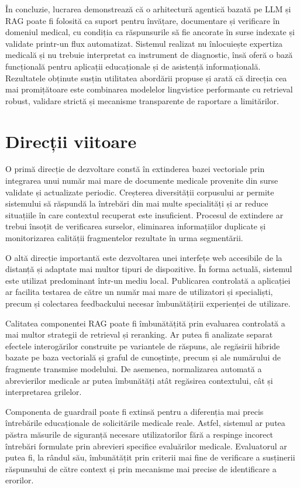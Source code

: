\documentclass[12pt, a4paper, oneside, romanian]{teza-upb}
\begin{document}
În concluzie, lucrarea demonstrează că o arhitectură agentică bazată pe LLM și RAG poate fi folosită ca suport pentru învățare, documentare și verificare în domeniul medical, cu condiția ca răspunsurile să fie ancorate în surse indexate și validate printr-un flux automatizat. Sistemul realizat nu înlocuiește expertiza medicală și nu trebuie interpretat ca instrument de diagnostic, însă oferă o bază funcțională pentru aplicații educaționale și de asistență informațională. Rezultatele obținute susțin utilitatea abordării propuse și arată că direcția cea mai promițătoare este combinarea modelelor lingvistice performante cu retrieval robust, validare strictă și mecanisme transparente de raportare a limitărilor.

\section{Direcții viitoare}

O primă direcție de dezvoltare constă în extinderea bazei vectoriale prin integrarea unui număr mai mare de documente medicale provenite din surse validate și actualizate periodic. Creșterea diversității corpusului ar permite sistemului să răspundă la întrebări din mai multe specialități și ar reduce situațiile în care contextul recuperat este insuficient. Procesul de extindere ar trebui însoțit de verificarea surselor, eliminarea informațiilor duplicate și monitorizarea calității fragmentelor rezultate în urma segmentării.

O altă direcție importantă este dezvoltarea unei interfețe web accesibile de la distanță și adaptate mai multor tipuri de dispozitive. În forma actuală, sistemul este utilizat predominant într-un mediu local. Publicarea controlată a aplicației ar facilita testarea de către un număr mai mare de utilizatori și specialiști, precum și colectarea feedbackului necesar îmbunătățirii experienței de utilizare.

Calitatea componentei RAG poate fi îmbunătățită prin evaluarea controlată a mai multor strategii de retrieval și reranking. Ar putea fi analizate separat efectele interogărilor construite pe variantele de răspuns, ale regăsirii hibride bazate pe baza vectorială și graful de cunoștințe, precum și ale numărului de fragmente transmise modelului. De asemenea, normalizarea automată a abrevierilor medicale ar putea îmbunătăți atât regăsirea contextului, cât și interpretarea grilelor.

Componenta de guardrail poate fi extinsă pentru a diferenția mai precis întrebările educaționale de solicitările medicale reale. Astfel, sistemul ar putea păstra măsurile de siguranță necesare utilizatorilor fără a respinge incorect întrebări formulate prin abrevieri specifice evaluărilor medicale. Evaluatorul ar putea fi, la rândul său, îmbunătățit prin criterii mai fine de verificare a susținerii răspunsului de către context și prin mecanisme mai precise de identificare a erorilor.
\end{document}
